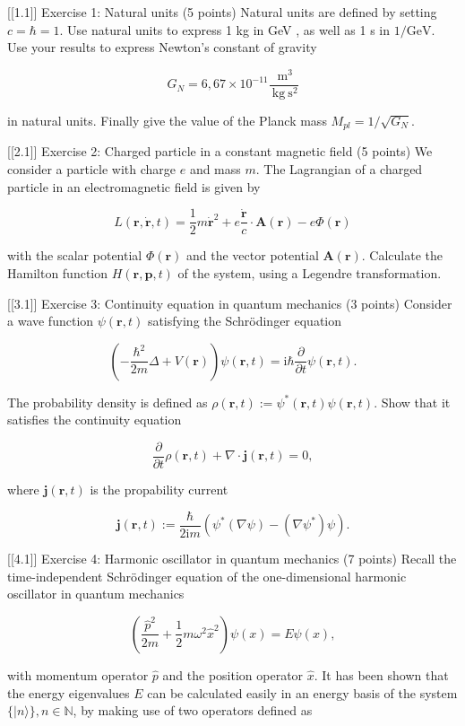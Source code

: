 
[[1.1]]
Exercise 1: Natural units (5 points)
Natural units are defined by setting $c=\hbar=1$.
Use natural units to express 1 kg in GeV , as well as 1 s in $1 / \mathrm{GeV}$. Use your results to express Newton's constant of gravity

$$
G_N=6,67 \times 10^{-11} \frac{\mathrm{~m}^3}{\mathrm{~kg} \mathrm{~s}^2}
$$

in natural units.
Finally give the value of the Planck mass $M_{p l}=1 / \sqrt{G_N}$.

[[2.1]]
Exercise 2: Charged particle in a constant magnetic field (5 points)
We consider a particle with charge $e$ and mass $m$. The Lagrangian of a charged particle in an electromagnetic field is given by

$$
L(\mathbf{r}, \dot{\mathbf{r}}, t)=\frac{1}{2} m \dot{\mathbf{r}}^2+e \frac{\dot{\mathbf{r}}}{c} \cdot \mathbf{A}(\mathbf{r})-e \Phi(\mathbf{r})
$$

with the scalar potential $\Phi(\mathbf{r})$ and the vector potential $\mathbf{A}(\mathbf{r})$.
Calculate the Hamilton function $H(\mathbf{r}, \mathbf{p}, t)$ of the system, using a Legendre transformation.

[[3.1]]
Exercise 3: Continuity equation in quantum mechanics (3 points)
Consider a wave function $\psi(\mathbf{r}, t)$ satisfying the Schrödinger equation

$$
\left(-\frac{\hbar^2}{2 m} \Delta+V(\mathbf{r})\right) \psi(\mathbf{r}, t)=\mathrm{i} \hbar \frac{\partial}{\partial t} \psi(\mathbf{r}, t) .
$$


The probability density is defined as $\rho(\mathbf{r}, t):=\psi^*(\mathbf{r}, t) \psi(\mathbf{r}, t)$. Show that it satisfies the continuity equation

$$
\frac{\partial}{\partial t} \rho(\mathbf{r}, t)+\nabla \cdot \mathbf{j}(\mathbf{r}, t)=0,
$$

where $\mathbf{j}(\mathbf{r}, t)$ is the propability current

$$
\mathbf{j}(\mathbf{r}, t):=\frac{\hbar}{2 \mathrm{i} m}\left(\psi^*(\nabla \psi)-\left(\nabla \psi^*\right) \psi\right) .
$$

[[4.1]]
Exercise 4: Harmonic oscillator in quantum mechanics (7 points)
Recall the time-independent Schrödinger equation of the one-dimensional harmonic oscillator in quantum mechanics

$$
\left(\frac{\hat{p}^2}{2 m}+\frac{1}{2} m \omega^2 \hat{x}^2\right) \psi(x)=E \psi(x),
$$

with momentum operator $\hat{p}$ and the position operator $\hat{x}$.
It has been shown that the energy eigenvalues $E$ can be calculated easily in an energy basis of the system $\{|n\rangle\}, n \in \mathbb{N}$, by making use of two operators defined as

